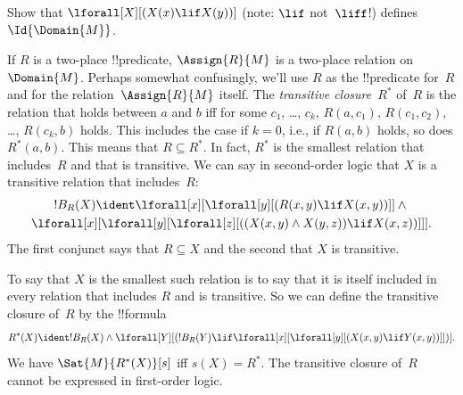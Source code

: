 \documentclass[../../../include/open-logic-section]{subfiles}
\begin{document}
\begin{prob}
Show that $\lforall[X][(X(x) \lif X(y))]$ (note:
$\lif$ not~$\liff$!) defines $\Id{\Domain{M}}$.
\end{prob}

\begin{ex}
If $R$ is a two-place !!{predicate}, $\Assign{R}{M}$ is a two-place
relation on~$\Domain{M}$.  Perhaps somewhat confusingly, we'll use $R$
as the !!{predicate} for~$R$ and for the relation~$\Assign{R}{M}$
itself.  The \emph{transitive closure}~$R^*$ of~$R$ is the relation
that holds between $a$ and $b$ iff for some $c_1$, \dots, $c_k$,
$R(a,c_1)$, $R(c_1, c_2)$, \dots, $R(c_k,b)$ holds. This includes the
case if $k = 0$, i.e., if $R(a,b)$ holds, so does $R^*(a,b)$. This
means that $R \subseteq R^*$. In fact, $R^*$ is the smallest relation
that includes~$R$ and that is transitive.  We can say in second-order
logic that $X$ is a transitive relation that includes~$R$:
\begin{multline*}
  !B_R(X) \ident \lforall[x][\lforall[y][(R(x,y) \lif X(x, y))]] \land {}\\
\lforall[x][\lforall[y][\lforall[z][((X(x,y) \land X(y,z)) \lif X(x,
      z))]]].
\end{multline*}
The first conjunct says that $R \subseteq X$ and the second
that $X$ is transitive.

To say that $X$ is the smallest such relation is to say that it is
itself included in every relation that includes $R$ and is
transitive. So we can define the transitive closure of~$R$ by the
!!{formula}
\[
R^*(X) \ident !B_R(X) \land \lforall[Y][(!B_R(Y) \lif
  \lforall[x][\lforall[y][(X(x, y) \lif Y(x,y))]])].
\]
We have $\Sat{M}{R^*(X)}[s]$ iff $s(X) = R^*$. The transitive closure
of~$R$ cannot be expressed in first-order logic.
\end{ex}
\end{document}
